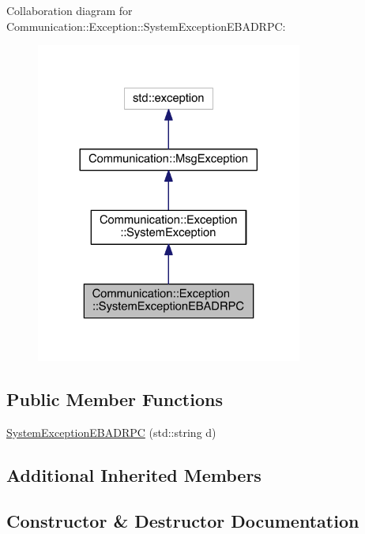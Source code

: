 Collaboration diagram for Communication\+:\+:Exception\+:\+:System\+Exception\+E\+B\+A\+D\+R\+P\+C\+:\nopagebreak
\begin{figure}[H]
\begin{center}
\leavevmode
\includegraphics[width=248pt]{class_communication_1_1_exception_1_1_system_exception_e_b_a_d_r_p_c__coll__graph}
\end{center}
\end{figure}
\subsection*{Public Member Functions}
\begin{DoxyCompactItemize}
\item 
\hyperlink{class_communication_1_1_exception_1_1_system_exception_e_b_a_d_r_p_c_abdf9775a259a485058d625325d876c53}{System\+Exception\+E\+B\+A\+D\+R\+P\+C} (std\+::string d)
\end{DoxyCompactItemize}
\subsection*{Additional Inherited Members}


\subsection{Constructor \& Destructor Documentation}
\hypertarget{class_communication_1_1_exception_1_1_system_exception_e_b_a_d_r_p_c_abdf9775a259a485058d625325d876c53}{}
